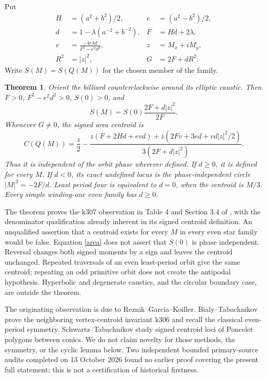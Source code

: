 \documentclass[11pt]{article}
\newtheorem{theorem}{Theorem}
\begin{document}
Put
\begin{align*}
 H&=(a^2+b^2)/2,& e&=(a^2-b^2)/2,\\
 d&=1-\lambda(a^{-2}+b^{-2}),&F&=Hd+2\lambda,\\
 v&=\frac{-4e\lambda d}{F^2-e^2d^2},&z&=M_x+iM_y,\\
 R^2&=|z|^2,&G&=2F+dR^2.
\end{align*}
Write $S(M)=S(Q(M))$ for the chosen member of the family.
\begin{theorem}\label{main}
Orient the billiard counterclockwise around its elliptic caustic. Then
$F>0$, $F^2-e^2d^2>0$, $S(0)>0$, and
\begin{equation}\label{area}
 S(M)=S(0)\frac{2F+d|z|^2}{2F}.
\end{equation}
Whenever $G\ne0$, the signed area centroid is
\begin{equation}\label{centroid}
 C(Q(M))=\frac z2-
 \frac{z(F+2Hd+evd)+\overline z(2Fv+3ed+vd|z|^2/2)}
 {3(2F+d|z|^2)}.
\end{equation}
Thus it is independent of the orbit phase wherever defined.
If $d\geq0$, it is defined for every $M$. If $d<0$, its exact undefined locus
is the phase-independent circle $|M|^2=-2F/d$. Least period four is equivalent
to $d=0$, when the centroid is $M/3$. Every simple winding-one even family
has $d\geq0$.
\end{theorem}

The theorem proves the k307 observation in Table 4 and Section 3.4 of
\cite{RGK}, with the denominator qualification already inherent in its signed
centroid definition. An unqualified assertion that a centroid exists for
every $M$ in every even star family would be false. Equation \eqref{area}
does not assert that $S(0)$ is phase independent.
Reversal changes both signed moments by a sign and leaves the centroid
unchanged. Repeated traversals of an even least-period orbit give the same
centroid; repeating an odd primitive orbit does not create the antipodal
hypothesis. Hyperbolic and degenerate caustics, and the circular boundary
case, are outside the theorem.

The originating observation is due to Reznik--Garcia--Koiller.
Bialy--Tabachnikov \cite[Theorems 4.1 and 4.3]{BT} prove the neighboring
vertex-centroid invariant k306 and recall the classical even-period symmetry.
Schwartz--Tabachnikov \cite{ST} study signed centroid loci of Poncelet
polygons between conics. We do not claim novelty for those methods, the
symmetry, or the cyclic lemma below. Two independent bounded primary-source
audits completed on 13 October 2026 found no earlier proof covering the
present full statement; this is not a certification of historical firstness.
\end{document}
